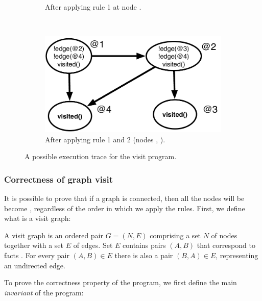 \begin{figure}[h]
\begin{subfigure}[b]{0.45\textwidth}
                \caption{After applying rule 1 at node .}
                \label{fig:exec_trace3}
        \end{subfigure}%
        ~ %
        \begin{subfigure}[b]{0.45\textwidth}
                  \includegraphics[width=\textwidth]{figures/visit/trace4}
                  \caption{After applying rule 1 and 2 (nodes ,
                        ).}
                  \label{fig:exec_trace4}
          \end{subfigure}
        \caption{A possible execution trace for the visit program.}\label{fig:exec_trace}
\end{figure}

\subsubsection{Correctness of graph visit}

It is possible to prove that if a graph is connected, then all the nodes will be
become , regardless of the order in which we apply the rules.
First, we define what is a visit graph:

\begin{definition}
A visit graph is an ordered pair $G = (N, E)$ comprising a set $N$ of nodes together
with a set $E$ of edges. Set $E$ contains pairs $(A, B)$ that correspond to
facts . For every pair $(A, B) \in E$ there is also a
pair $(B, A) \in E$, representing an undirected edge.
\end{definition}

To prove the correctness property of the program, we first define the main
\emph{invariant} of the program:

